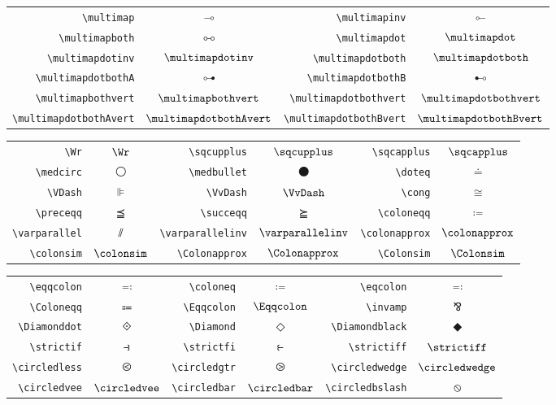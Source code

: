 \documentclass[a4paper,11pt]{article}
\begin{document}
\begin{center}\begin{tabular}{r>{$}c<{$}|r>{$}c<{$}}

\verb=\multimap=&\multimap&\verb=\multimapinv=&\multimapinv\\
\verb=\multimapboth=&\multimapboth&\verb=\multimapdot=&\multimapdot\\
\verb=\multimapdotinv=&\multimapdotinv&\verb=\multimapdotboth=&\multimapdotboth\\
\verb=\multimapdotbothA=&\multimapdotbothA&\verb=\multimapdotbothB=&\multimapdotbothB\\
\verb=\multimapbothvert=&\multimapbothvert&\verb=\multimapdotbothvert=&\multimapdotbothvert\\
\verb=\multimapdotbothAvert=&\multimapdotbothAvert&\verb=\multimapdotbothBvert=&\multimapdotbothBvert\\

\end{tabular}\end{center}

\begin{center}\begin{tabular}{r>{$}c<{$}|r>{$}c<{$}|r>{$}c<{$}}

\verb=\Wr=&\Wr&\verb=\sqcupplus=&\sqcupplus&\verb=\sqcapplus=&\sqcapplus\\
\verb=\medcirc=&\medcirc&\verb=\medbullet=&\medbullet&\verb=\doteq=&\doteq\\
\verb=\VDash=&\VDash&\verb=\VvDash=&\VvDash&
\verb=\cong=&\cong\\
\verb=\preceqq=&\preceqq&
\verb=\succeqq=&\succeqq&\verb=\coloneqq=&\coloneqq\\
\verb=\varparallel=&\varparallel&\verb=\varparallelinv=&\varparallelinv&\verb=\colonapprox=&\colonapprox\\
\verb=\colonsim=&\colonsim&\verb=\Colonapprox=&\Colonapprox&\verb=\Colonsim=&\Colonsim\\

\end{tabular}\end{center}

\begin{center}\begin{tabular}{r>{$}c<{$}|r>{$}c<{$}|r>{$}c<{$}}

\verb=\eqqcolon=&\eqqcolon&\verb=\coloneq=&\coloneq&\verb=\eqcolon=&\eqcolon\\
\verb=\Coloneqq=&\Coloneqq&
\verb=\Eqqcolon=&\Eqqcolon&\verb=\invamp=&\invamp\\
\verb=\Diamonddot=&\Diamonddot&\verb=\Diamond=&\Diamond&\verb=\Diamondblack=&\Diamondblack\\
\verb=\strictif=&\strictif&\verb=\strictfi=&\strictfi&\verb=\strictiff=&\strictiff\\
\verb=\circledless=&\circledless&\verb=\circledgtr=&\circledgtr&\verb=\circledwedge=&\circledwedge\\
\verb=\circledvee=&\circledvee&\verb=\circledbar=&\circledbar&\verb=\circledbslash=&\circledbslash

\end{tabular}\end{center}
\end{document}
